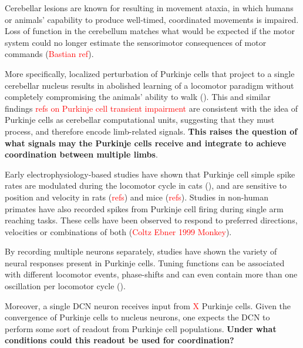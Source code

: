 Cerebellar lesions are known for resulting in movement ataxia, in which humans or animals' capability to produce well-timed, coordinated movements is impaired. Loss of function in the cerebellum matches what would be expected if the motor system could no longer estimate the sensorimotor consequences of motor commands (\textcolor{red}{Bastian ref}).

More specifically, localized perturbation of Purkinje cells that project to a single cerebellar nucleus results in abolished learning of a locomotor paradigm without completely compromising the animals' ability to walk (\cite{darmohray_spatial_2019}). This and similar findings \textcolor{red}{refs on Purkinje cell transient impairment} are consistent with the idea of Purkinje cells as cerebellar computational units, suggesting that they must process, and therefore encode limb-related signals. \textbf{This raises the question of what signals may the Purkinje cells receive and integrate to achieve coordination between multiple limbs}.

Early electrophysiology-based studies have shown that Purkinje cell simple spike rates are modulated during the locomotor cycle in cats (\cite{udoSimpleComplexSpike1981, armstrongDischargesPurkinjeCells1984, smithSensorimotorcorrelatedDischargeRecorded1995}), and are sensitive to position and velocity in rats (\textcolor{red}{refs}) and mice (\textcolor{red}{refs}). 
Studies in non-human primates have also recorded spikes from Purkinje cell firing during single arm reaching tasks. These cells have been observed to respond to preferred directions, velocities or combinations of both (\textcolor{red}{Coltz Ebner 1999 Monkey}).

By recording multiple neurons separately, studies have shown the variety of neural responses present in Purkinje cells. Tuning functions can be associated with different locomotor events, phase-shifts and can even contain more than one oscillation per locomotor cycle ().




Moreover, a single DCN neuron receives input from \textcolor{red}{X} Purkinje cells. Given the convergence of Purkinje cells to nucleus neurons, one expects the DCN to perform some sort of readout from Purkinje cell populations. \textbf{Under what conditions could this readout be used for coordination?}

